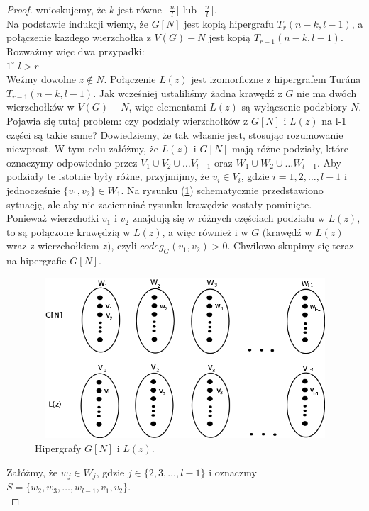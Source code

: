 \documentclass[miz,woman]{mgrwms}
\begin{document}
\begin{proof}
wnioskujemy, że $k$ jest równe $\lfloor \frac{n}{l} \rfloor$ lub $\lceil \frac{n}{l} \rceil$.\\
Na podstawie indukcji wiemy, że $G[N]$ jest kopią hipergrafu $T_r(n-k,l-1)$, a połączenie każdego wierzchołka z $V(G)-N$
jest kopią $T_{r-1}(n-k,l-1)$. Rozważmy więc dwa przypadki:\\
$1^{\circ}$ $l>r$\\
Weźmy dowolne $z\notin N$. Połączenie $L(z)$ jest izomorficzne z hipergrafem Tur\'ana\\ $T_{r-1}(n-k,l-1)$. Jak wcześniej
ustaliliśmy żadna krawędź z $G$ nie ma dwóch wierzchołków w $V(G)-N$, więc elementami $L(z)$ są wyłączenie podzbiory $N$.
Pojawia się tutaj problem: czy podziały wierzchołków z $G[N]$ i $L(z)$ na l-1 części są takie same? 
Dowiedziemy, że tak własnie jest, stosując rozumowanie niewprost. W tym celu załóżmy, że $L(z)$ i $G[N]$ mają różne
podziały, które oznaczymy odpowiednio przez $V_1\cup V_2\cup \dots V_{l-1}$ oraz $W_1\cup W_2\cup \dots W_{l-1}$. 
Aby podziały te istotnie były różne, przyjmijmy, że $v_i \in V_i$, gdzie $i=1,2,\dots,l-1$ i jednocześnie 
$\{v_1,v_2\}\in W_1$. Na rysunku (\ref{d1}) schematycznie przedstawiono sytuację, ale aby nie zaciemniać  rysunku krawędzie
zostały pominięte.\\
Ponieważ wierzchołki $v_1$ i $v_2$ znajdują się w różnych częściach podziału w $L(z)$, to są połączone
krawędzią w $L(z)$, a więc również i w $G$ (krawędź w $L(z)$ wraz z wierzchołkiem $z$), czyli $codeg_G(v_1,v_2)>0$. 
Chwilowo skupimy się teraz na hipergrafie $G[N]$.\\
\begin{figure}[h]
\centering
\includegraphics[width=12cm, height=6cm]{d1.png}
   \caption{Hipergrafy $G[N]$ i $L(z)$.}
    \label{d1}
\end{figure}
Załóżmy, że $w_j\in W_j$, gdzie $j\in \{2,3,\dots,l-1\}$ i 
oznaczmy $S=\{w_2,w_3,\dots,w_{l-1},v_1,v_2\}$.\\

\end{proof}
\end{document}
